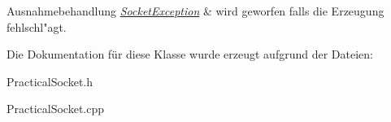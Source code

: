 \begin{DoxyExceptions}{Ausnahmebehandlung}
{\em \hyperlink{classSocketException}{Socket\-Exception}} & wird geworfen falls die Erzeugung fehlschl"agt. \\
\hline
\end{DoxyExceptions}


Die Dokumentation für diese Klasse wurde erzeugt aufgrund der Dateien\-:\begin{DoxyCompactItemize}
\item 
Practical\-Socket.\-h\item 
Practical\-Socket.\-cpp\end{DoxyCompactItemize}
